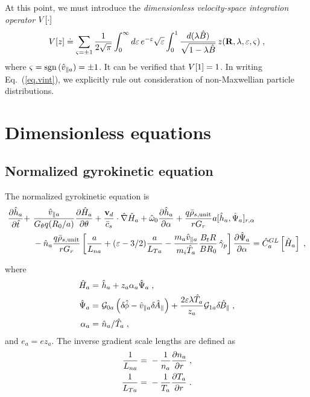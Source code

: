At this point, we must introduce the {\it dimensionless 
velocity-space integration operator} $V[\cdot]$
%
\begin{equation}
V[z] \doteq \sum_{{\varsigma}=\pm 1} \frac{1}{2\sqrt{\pi}}
\int_0^\infty  d{\varepsilon} \, e^{-{\varepsilon}} \sqrt{{\varepsilon}} 
\int_0^1 \frac{d(\lambda\hat{B})}{\sqrt{1-\lambda\hat{B}}} 
\, z(\mathbf{R},\lambda,{\varepsilon},{\varsigma}) \; ,
\label{eq.vint}
\end{equation}
%
where ${\varsigma} = {\rm sgn}\,(\hat{v}_{\parallel a}) = \pm 1$.  It can be verified 
that $V[1]=1$.  In writing Eq.~(\ref{eq.vint}), we explicitly 
rule out consideration of non-Maxwellian particle distributions.

\section{Dimensionless equations}

\subsection{Normalized gyrokinetic equation}

The normalized gyrokinetic equation is
%
\begin{align}
\frac{\partial\hat{h}_a}{\partial\hat{t}} 
+ &~\frac{\hat{v}_{\parallel a}}{G_\theta q (R_0/a)} \frac{\partial \hat{H}_a}{\partial\theta} 
+ \frac{\mathbf{v}_d}{\bar{c}_s} \cdot \hat{\nabla} \hat{H}_a
+ \hat{\omega}_0 \frac{\partial\hat{h}_a}{\partial\alpha}
+ \frac{q \bar{\rho}_{s,{\rm unit}}}{r G_r} a [\hat{h}_a,\hat{\Psi}_a]_{r,\alpha} \nonumber \\
 &~ - {\hat n}_a \frac{q\bar{\rho}_{s,{\rm unit}}}{r G_r} 
 \left[ \frac{a}{L_{na}} + ({\varepsilon}-3/2) \frac{a}{L_{Ta}} 
 - \frac{m_a \hat{v}_{\parallel a}}{m_i \hat{T}_a} \frac{B_t R}{B R_0} \, \hat{\gamma}_p \right] 
 \frac{\partial \hat{\Psi}_a}{\partial\alpha} 
= \hat{C}_a^{GL}\left[\hat{H}_a\right] \; ,
\end{align}

\noindent
where
%
\begin{align}
\hat{H}_a = &~\hat{h}_a + z_a \alpha_a \hat{\Psi}_a \; , \\
\hat{\Psi}_a = &~{\cal G}_{0a} \left( \delta \hskip -1pt \hat{\phi} - \hat{v}_{\parallel a} \delta \hskip -1pt \hat{A}_\parallel \right) + 
\frac{2 \varepsilon \lambda \hat{T}_a}{z_a} {\cal G}_{1a}\delta \hskip -1pt \hat{B}_\parallel \; , \\ 
\alpha_a = &~\hat{n}_a/\hat{T}_a \; , 
\end{align}
%
and $e_a = e z_a$.  The inverse gradient scale lengths are defined as 
%
\begin{align}
\frac{1}{L_{na}} = &~-\frac{1}{n_a}\frac{\partial n_a}{\partial r} \; , \\
\frac{1}{L_{Ta}} = &~-\frac{1}{T_a}\frac{\partial T_a}{\partial r} \; .
\end{align}

